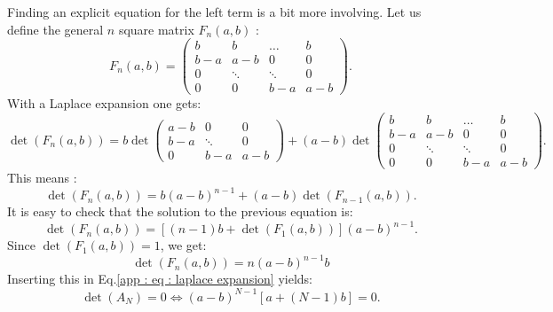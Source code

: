\documentclass[12pt]{report}
\begin{document}
Finding an explicit equation for the left term is a bit more involving. Let us define the general $n$ square matrix $F_n(a,b)$ :
\begin{equation}
F_n(a,b) = \begin{pmatrix}
b & b & \dots & b \\
b-a & a-b & 0 & 0 \\
0 & \ddots & \ddots & 0 \\
0 & 0 & b-a & a-b
\end{pmatrix}.
\end{equation}
With a Laplace expansion one gets:
\begin{equation}
\det\left(F_n(a,b)\right)= b
\det\begin{pmatrix}
a-b & 0 & 0 \\
b-a & \ddots & 0 \\
0 & b-a & a-b
\end{pmatrix}+(a-b)\det\begin{pmatrix}
b & b & \dots & b \\
b-a & a-b & 0 & 0 \\
0 & \ddots & \ddots & 0 \\
0 & 0 & b-a & a-b
\end{pmatrix}.
\end{equation}
This means :
\begin{equation}
\det(F_n(a,b))=b(a-b)^{n-1}+(a-b)\det(F_{n-1}(a,b)).
\end{equation}
It is easy to check that the solution to the previous equation is:
\begin{equation}
\det(F_n(a,b))=\left[(n-1)b+\det\left(F_1(a,b)\right)\right](a-b)^{n-1}.
\end{equation}
Since $\det\left(F_1(a,b)\right)=1$, we get:
\begin{equation}
\det\left(F_n(a,b)\right)=n(a-b)^{n-1}b
\end{equation}
Inserting this in Eq.\eqref{app : eq : laplace expansion} yields:
\begin{equation}
\boxed{
\det(A_N)=0 \iff (a-b)^{N-1}\left[a+(N-1)b\right]=0.
}\label{eq : formula special determinant}
\end{equation}
\end{document}
